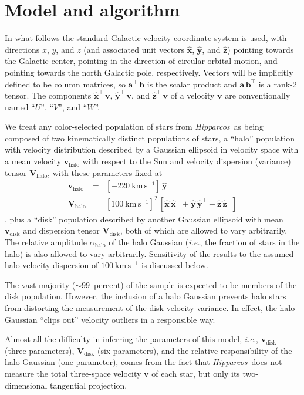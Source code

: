 \documentclass[12pt,preprint]{aastex}
\newcommand{\latin}[1]{\textit{#1}}
\newcommand{\ie}{\latin{i.e.}}
\newcommand{\Hipparcos}{\textit{Hipparcos}}
\renewcommand{\vec}[1]{\mathbf{#1}} %
\newcommand{\vv}{\vec{v}}
\newcommand{\eex}{\vec{\hat{x}}}
\newcommand{\eey}{\vec{\hat{y}}}
\newcommand{\eez}{\vec{\hat{z}}}
\newcommand{\vvdisk}{\vv_\mathrm{disk}}
\newcommand{\vvhalo}{\vv_\mathrm{halo}}
\newcommand{\ten}[1]{\mathbf{#1}} %
\newcommand{\VV}{\ten{V}}
\newcommand{\VVdisk}{\VV_\mathrm{\!disk}}
\newcommand{\VVhalo}{\VV_\mathrm{\!halo}}
\newcommand{\T}{^{\scriptscriptstyle \top}}   %
\newcommand{\alphahalo}{\alpha_\mathrm{halo}}
\begin{document}
\section{Model and algorithm}

In what follows the standard Galactic velocity coordinate system is
used, with directions $x$, $y$, and $z$ (and associated unit vectors
$\eex$, $\eey$, and $\eez$) pointing towards the Galactic center,
pointing in the direction of circular orbital motion, and pointing
towards the north Galactic pole, respectively.  Vectors will be
implicitly defined to be column matrices, so $\vec{a}\T\,\vec{b}$ is
the scalar product and $\vec{a}\,\vec{b}\T$ is a rank-2 tensor.  The
components $\eex\T\,\vv$, $\eey\T\,\vv$, and $\eez\T\,\vv$ of a
velocity $\vv$ are conventionally named ``$U$'', ``$V$'', and ``$W$''.

We treat any color-selected population of stars from \Hipparcos\ as
being composed of two kinematically distinct populations of stars, a
``halo'' population with velocity distribution described by a Gaussian
ellipsoid in velocity space with a mean velocity $\vvhalo$ with
respect to the Sun and velocity dispersion (variance) tensor
$\VVhalo$, with these parameters fixed at
\begin{eqnarray}\displaystyle
\vvhalo &=& [-220~\mathrm{km\,s^{-1}}]\,\eey \nonumber \\
\VVhalo &=& [100~\mathrm{km\,s^{-1}}]^2\,
            [\eex\,\eex\T+\eey\,\eey\T+\eez\,\eez\T]
\label{eq:haloparameters}
\end{eqnarray}
\citep{sirko04a}, plus a ``disk'' population described by another
Gaussian ellipsoid with mean $\vvdisk$ and dispersion tensor
$\VVdisk$, both of which are allowed to vary arbitrarily.  The
relative amplitude $\alphahalo$ of the halo Gaussian (\ie, the
fraction of stars in the halo) is also allowed to vary arbitrarily.
Sensitivity of the results to the assumed halo velocity dispersion of
$100~\mathrm{km\,s^{-1}}$ is discussed below.

The vast majority ($\sim 99$~percent) of the sample is expected to be
members of the disk population.  However, the inclusion of a halo
Gaussian prevents halo stars from distorting the measurement of the
disk velocity variance.  In effect, the halo Gaussian ``clips out''
velocity outliers in a responsible way.

Almost all the difficulty in inferring the parameters of this model,
\ie, $\vvdisk$ (three parameters), $\VVdisk$ (six parameters), and the
relative responsibility of the halo Gaussian (one parameter), comes
from the fact that \Hipparcos\ does not measure the total three-space
velocity $\vv$ of each star, but only its two-dimensional tangential
projection.
\end{document}
